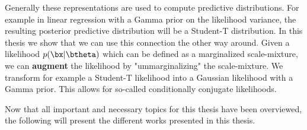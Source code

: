 Generally these representations are used to compute predictive distributions.
For example in linear regression with a Gamma prior on the likelihood variance, the resulting posterior predictive distribution will be a Student-T distribution.
In this thesis we show that we can use this connection the other way around.
Given a likelihood $p(\bx|\btheta)$ which can be defined as a marginalized scale-mixture,
we can \textbf{augment} the likelihood by "ummarginalizing" the scale-mixture.
We transform for example a Student-T likelihood into a Gaussian likelihood with a Gamma prior.
This allows for so-called conditionally conjugate likelihoods.


Now that all important and necessary topics for this thesis have been overviewed, the following will present the different works presented in this thesis. 
